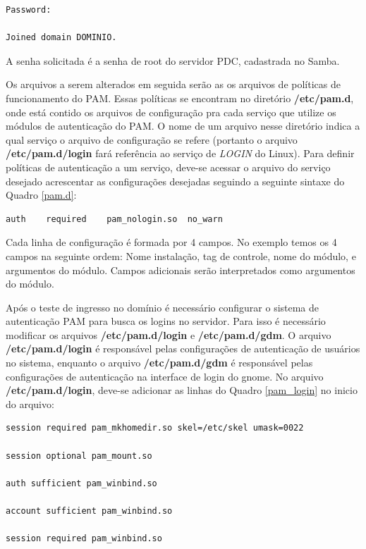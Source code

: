 \begin{lstlisting}[caption=Resultado quando a máquina é adicionada com sucesso no domínio,label={result_join}]	
Password:

Joined domain DOMINIO.
\end{lstlisting}

A senha solicitada é a senha de root do servidor PDC, cadastrada no Samba.

Os arquivos a serem alterados em seguida serão as os arquivos de políticas de funcionamento do PAM. Essas políticas se encontram no diretório \textbf{/etc/pam.d}, onde está contido os arquivos de configuração pra cada serviço que utilize os módulos de autenticação do PAM. O nome de um arquivo nesse diretório indica a qual serviço o arquivo de configuração se refere (portanto o arquivo \textbf{/etc/pam.d/login} fará referência ao serviço de \textit{LOGIN} do Linux).
Para definir políticas de autenticação a um serviço, deve-se acessar o arquivo do serviço desejado acrescentar as configurações desejadas seguindo a seguinte sintaxe do Quadro \ref{pam.d}:\\

\begin{lstlisting}[caption=Exemplo de configuração do /etc/pam.d/login,label={pam.d}]
auth	required	pam_nologin.so	no_warn
\end{lstlisting}

Cada linha de configuração é formada por 4 campos. No exemplo temos os 4 campos na seguinte ordem: Nome instalação, tag de controle, nome do módulo, e argumentos do módulo. Campos adicionais serão interpretados como argumentos do módulo.

Após o teste de ingresso no domínio é necessário configurar o sistema de autenticação PAM para busca os logins no servidor. Para isso é necessário modificar os arquivos \textbf{/etc/pam.d/login} e \textbf{/etc/pam.d/gdm}. O arquivo \textbf{/etc/pam.d/login} é responsável pelas configurações de autenticação de usuários no sistema, enquanto o arquivo \textbf{/etc/pam.d/gdm} é responsável pelas configurações de autenticação na interface de login do gnome.
No arquivo \textbf{/etc/pam.d/login}, deve-se adicionar as linhas do Quadro \ref{pam_login} no inicio do arquivo:\\

\begin{lstlisting}[caption=Linhas do arquivo /etc/pam.d/login,label={pam_login}]
session required pam_mkhomedir.so skel=/etc/skel umask=0022

session optional pam_mount.so

auth sufficient pam_winbind.so

account sufficient pam_winbind.so

session required pam_winbind.so
\end{lstlisting}

